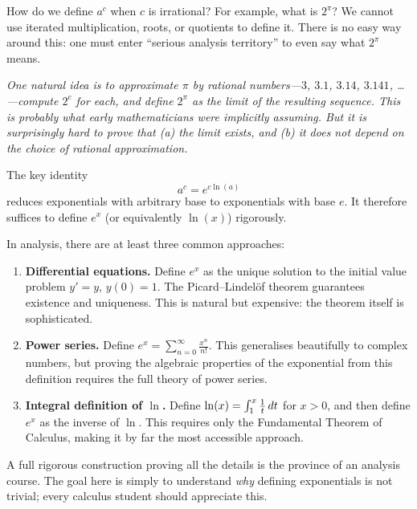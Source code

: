 \begin{remark}
How do we define $a^{c}$ when $c$ is irrational?  For example, what is $2^{\pi}$?  We cannot use iterated multiplication, roots, or quotients to define it.  There is no easy way around this: one must enter ``serious analysis territory'' to even say what $2^{\pi}$ means.
\end{remark}

\textit{One natural idea is to approximate $\pi$ by rational numbers---$3$, $3.1$, $3.14$, $3.141$, \ldots---compute $2^{c}$ for each, and define $2^{\pi}$ as the limit of the resulting sequence.  This is probably what early mathematicians were implicitly assuming.  But it is surprisingly hard to prove that (a) the limit exists, and (b) it does not depend on the choice of rational approximation.}

The key identity
\[
  a^{c} = e^{c \ln(a)}
\]
reduces exponentials with arbitrary base to exponentials with base $e$.  It therefore suffices to define $e^{x}$ (or equivalently $\ln(x)$) rigorously.

\begin{remark}
In analysis, there are at least three common approaches:
\begin{enumerate}[label=(\roman*)]
  \item \textbf{Differential equations.} Define $e^{x}$ as the unique solution to the initial value problem $y' = y$, $y(0) = 1$.  The Picard--Lindel\"of theorem guarantees existence and uniqueness.  This is natural but expensive: the theorem itself is sophisticated.
  \item \textbf{Power series.} Define $e^{x} = \sum_{n=0}^{\infty} \frac{x^{n}}{n!}$.  This generalises beautifully to complex numbers, but proving the algebraic properties of the exponential from this definition requires the full theory of power series.
  \item \textbf{Integral definition of $\ln$.} Define $\ln(x) = \int_{1}^{x} \frac{1}{t} \,dt$ for $x > 0$, and then define $e^{x}$ as the inverse of $\ln$.  This requires only the Fundamental Theorem of Calculus, making it by far the most accessible approach.
\end{enumerate}
\end{remark}

\begin{remark}
A full rigorous construction proving all the details is the province of an analysis course.  The goal here is simply to understand \textit{why} defining exponentials is not trivial; every calculus student should appreciate this.
\end{remark}

